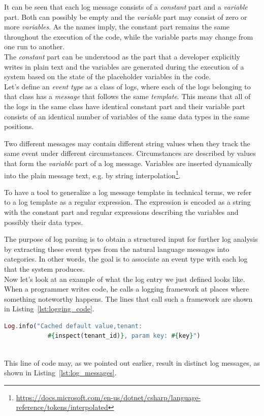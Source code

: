 It can be seen that each log message consists of a \textit{constant} part and a \textit{variable} part. Both can possibly be empty and the \textit{variable} part may consist of zero or more \textit{variables}.
As the names imply, the constant part remains the same throughout the execution of the code, while the variable parts may change from one run to another.\\
The \textit{constant} part can be understood as the part that a developer explicitly writes in plain text and the variables are generated during the execution of a system based on the state of the placeholder variables in the code.\\

Let's define an \textit{event type} as a class of logs, where each of the logs belonging to that class has a \textit{message} that follows the same \textit{template}. This means that all of the logs in the same class have identical constant part and their variable part consists of an identical number of variables of the same data types in the same positions.

Two different messages may contain different string values when they track the same event under different circumstances. Circumstances are described by values that form the \textit{variable} part of a log message. Variables are inserted dynamically into the plain message text, e.g. by string interpolation\footnote{\url{https://docs.microsoft.com/en-us/dotnet/csharp/language-reference/tokens/interpolated}}.

To have a tool to generalize a log message template in technical terms, we refer to a log template as a regular expression. The expression is encoded as a string with the constant part and regular expressions describing the variables and possibly their data types.

The purpose of log parsing is to obtain a structured input for further log analysis by extracting these event types from the natural language messages into categories.
In other words, the goal is to associate an event type with each log that the system produces.\\

Now let's look at an example of what the log entry we just defined looks like.
When a programmer writes code, he calls a logging framework at places where something noteworthy happens. The lines that call such a framework are shown in Listing~\ref{lst:logging_code}.\\

\begin{lstlisting}[language=elixir, caption={Example of how logging is done in source code}, captionpos=b, label={lst:logging_code}]
Log.info("Cached default value,tenant: 
            #{inspect(tenant_id)}, param key: #{key}")
\end{lstlisting}
\\
This line of code may, as we pointed out earlier, result in distinct log messages, as shown in Listing~\ref{lst:log_messages}.\\

